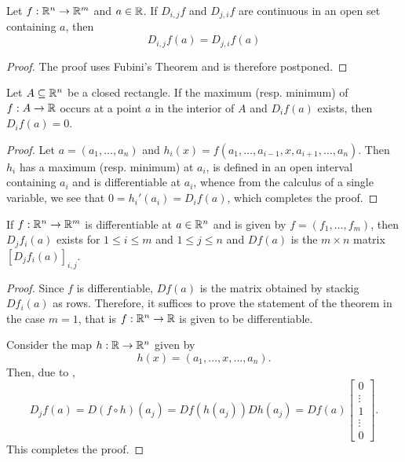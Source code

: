 \begin{theorem}
    Let $f:\mathbb{R}^n\to\mathbb{R}^m$ and $a\in\mathbb{R}$. If $D_{i,j}f$ and $D_{j,i}f$ are continuous in an open set containing $a$, then 
    \begin{equation*}
        D_{i,j}f(a) = D_{j,i}f(a)
    \end{equation*}
\end{theorem}
\begin{proof}
    The proof uses Fubini's Theorem and is therefore postponed.
\end{proof}

\begin{lemma}
    Let $A\subseteq\mathbb{R}^n$ be a closed rectangle. If the maximum (resp. minimum) of $f: A\to\mathbb{R}$ occurs at a point $a$ in the interior of $A$ and $D_if(a)$ exists, then $D_if(a) = 0$.
\end{lemma}
\begin{proof}
    Let $a = (a_1,\ldots,a_n)$ and $h_i(x) = f(a_1,\ldots,a_{i - 1}, x, a_{i + 1},\ldots,a_n)$. Then $h_i$ has a maximum (resp. minimum) at $a_i$, is defined in an open interval containing $a_i$ and is differentiable at $a_i$, whence from the calculus of a single variable, we see that $0 = h_i'(a_i) = D_if(a)$, which completes the proof.
\end{proof}

\begin{theorem}
    If $f:\mathbb{R}^n\to\mathbb{R}^m$ is differentiable at $a\in\mathbb{R}^n$ and is given by $f = (f_1,\ldots,f_m)$, then $D_jf_i(a)$ exists for $1\le i\le m$ and $1\le j\le n$ and $Df(a)$ is the $m\times n$ matrix $\left[D_jf_i(a)\right]_{i,j}$.
\end{theorem}
\begin{proof}
    Since $f$ is differentiable, $Df(a)$ is the matrix obtained by stackig $Df_i(a)$ as rows. Therefore, it suffices to prove the statement of the theorem in the case $m = 1$, that is $f:\mathbb{R}^n\to\mathbb{R}$ is given to be differentiable. 
    
    Consider the map $h:\mathbb{R}\to\mathbb{R}^n$ given by 
    \begin{equation*}
        h(x) = (a_1,\ldots,x,\ldots,a_n).
    \end{equation*}
    Then, due to ,
    \begin{equation*}
        D_jf(a) = D(f\circ h)(a_j) = Df(h(a_j))Dh(a_j) = Df(a)
        \begin{bmatrix}
            0\\\vdots\\ 1\\\vdots\\ 0
        \end{bmatrix}.
    \end{equation*}
    This completes the proof.
\end{proof}

